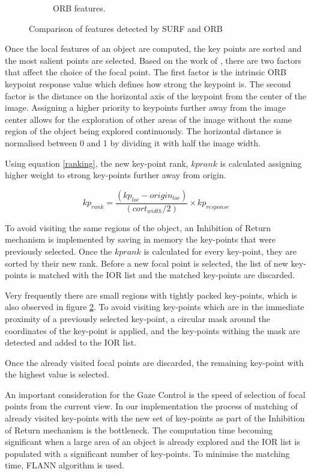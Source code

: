 \documentclass{l4proj}
\begin{document}
\begin{figure}[ht]
\begin{subfigure}[b]{0.49\textwidth}
    \caption{ORB features. }
    \label{orbfeatures}
  \end{subfigure}
  \caption{Comparison of features detected by SURF and ORB}
  \label{features}

\end{figure}

Once the local features of an object are computed, the key points are sorted and the most salient points are selected. Based on the work of \citet{RyanWong}, there are two factors that affect the choice of the focal point. The first factor is the intrinsic ORB keypoint response value which defines how strong the keypoint is. The second factor is the distance on the horizontal axis of the keypoint from the center of the image. Assigning a higher priority to keypoints further away from the image center allows for the exploration of other areas of the image without the same region of the object being explored continuously. The horizontal distance is normalised between 0 and 1 by dividing it with half the image width. 


Using equation \ref{ranking}, the new key-point rank, $kp{rank}$ is calculated assigning higher weight to strong key-points further away from origin.


\begin{equation}\label{ranking}
 kp_{rank} = \frac{(kp_{loc} - origin_{loc})}{(cort_{width}/2)} \times kp_{response}
\end{equation}

 
To avoid visiting the same regions of the object, an Inhibition of Return mechanism is implemented by saving in memory the key-points that were previously selected. Once the $kp{rank}$ is calculated for every key-point, they are sorted by their new rank. Before a new focal point is selected, the list of new key-points is matched with the IOR list and the matched key-points are discarded. 

Very frequently there are small regions with tightly packed key-points, which is also observed in figure \ref{features}. To avoid visiting key-points which are in the immediate proximity of a previously selected key-point, a circular mask around the coordinates of the key-point is applied, and the key-points withing the mask are detected and added to the IOR list. 

Once the already visited focal points are discarded, the remaining key-point with the highest value is selected. 

An important consideration for the Gaze Control is the speed of selection of focal points from the current view. In our implementation
the process of matching of already visited key-points with the new set of key-points as part of the Inhibition of Return mechanism is the bottleneck. The computation time becoming significant when a large area of an object is already explored and the IOR list   is populated with a significant number of key-points. To minimise the matching time, FLANN algorithm is used. 
\end{document}
